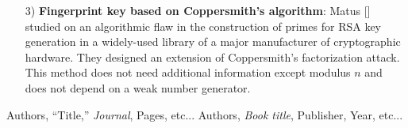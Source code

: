 \documentclass[a4paper]{article}
\begin{document}
\begin{enumerate}[label=]
       \item[3)] \textbf{Fingerprint key based on Coppersmith's algorithm}: Matus [] studied on an algorithmic flaw in the construction of primes for RSA key generation in a widely-used library of a major manufacturer of cryptographic hardware. They designed an extension of Coppersmith's factorization attack. This method does not need additional information except modulus $n$ and does not depend on a weak number generator.   
\end{enumerate}

\begin{thebibliography}{9}
Authors, ``Title,'' {\em Journal}, Pages, etc...
Authors, {\em Book title}, Publisher, Year, etc...
\end{thebibliography}
\end{document}
